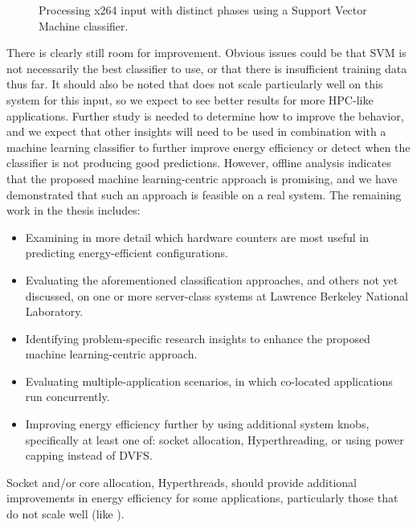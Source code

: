 \begin{figure}[t]
  
  \caption{Processing x264 input with distinct phases using a Support Vector Machine classifier.}
  \label{fig:classifier-phases-x264}
\end{figure}

There is clearly still room for improvement.
Obvious issues could be that SVM is not necessarily the best classifier to use, or that there is insufficient training data thus far.
It should also be noted that  does not scale particularly well on this system for this input, so we expect to see better results for more HPC-like applications.
Further study is needed to determine how to improve the behavior, and we expect that other insights will need to be used in combination with a machine learning classifier to further improve energy efficiency or detect when the classifier is not producing good predictions.
However, offline analysis indicates that the proposed machine learning-centric approach is promising, and we have demonstrated that such an approach is feasible on a real system.
The remaining work in the thesis includes:
\begin{itemize}
\item Examining in more detail which hardware counters are most useful in predicting energy-efficient configurations.
\item Evaluating the aforementioned classification approaches, and others not yet discussed, on one or more server-class systems at Lawrence Berkeley National Laboratory.
\item Identifying problem-specific research insights to enhance the proposed machine learning-centric approach.
\item Evaluating multiple-application scenarios, in which co-located applications run concurrently.
\item Improving energy efficiency further by using additional system knobs, specifically at least one of: socket allocation, Hyperthreading, or using power capping instead of DVFS.
\end{itemize}
Socket and/or core allocation, \eg Hyperthreads, should provide additional improvements in energy efficiency for some applications, particularly those that do not scale well (like ).
